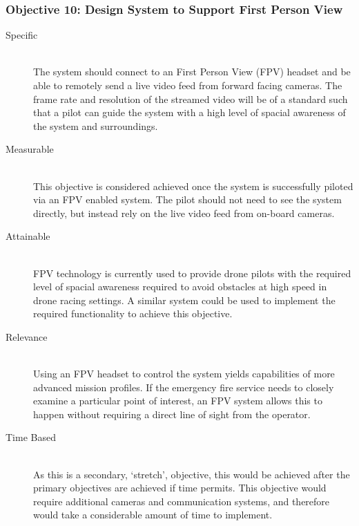 \begin{appendices}
\subsubsection{Objective 10: Design System to Support First Person View}
\begin{description}
    \item[Specific] \hfill \\
    The system should connect to an First Person View (FPV) headset and be able to remotely send a live video feed from forward facing cameras. The frame rate and resolution of the streamed video will be of a standard such that a pilot can guide the system with a high level of spacial awareness of the system and surroundings.
    \item[Measurable] \hfill \\ 
    This objective is considered achieved once the system is successfully piloted via an FPV enabled system. The pilot should not need to see the system directly, but instead rely on the live video feed from on-board cameras.
    \item[Attainable] \hfill \\
    FPV technology is currently used to provide drone pilots with the required level of spacial awareness required to avoid obstacles at high speed in drone racing settings. A similar system could be used to implement the required functionality to achieve this objective.
    \item[Relevance] \hfill \\
    Using an FPV headset to control the system yields capabilities of more advanced mission profiles. If the emergency fire service needs to closely examine a particular point of interest, an FPV system allows this to happen without requiring a direct line of sight from the operator.
    \item[Time Based] \hfill \\
    As this is a secondary, `stretch', objective, this would be achieved after the primary objectives are achieved if time permits. This objective would require additional cameras and communication systems, and therefore would take a considerable amount of time to implement.
\end{description}

\clearpage
\newpage


\end{appendices}
